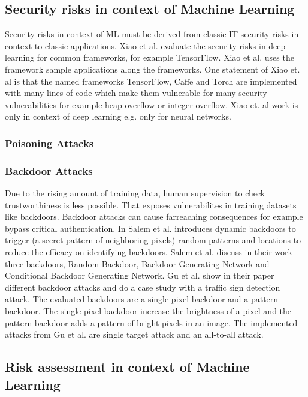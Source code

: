 \subsection{Security risks in context of Machine Learning}

Security risks in context of ML must be derived from classic IT security risks in context to classic applications. Xiao et al. \cite{DBLP:conf/sp/XiaoLZX18} evaluate the security risks in
deep learning for common frameworks, for example TensorFlow. Xiao et al. uses the framework sample applications along the frameworks. One statement of Xiao et. al is that the named
frameworks TensorFlow, Caffe and Torch are implemented with many lines of code which make them vulnerable for many security vulnerabilities for example heap overflow or integer overflow.
Xiao et. al work is only in context of deep learning e.g. only for neural networks.

\subsubsection*{Poisoning Attacks}


\subsubsection*{Backdoor Attacks}
\label{sec:backdoor}
Due to the rising amount of training data, human supervision to check trustworthiness is less possible. That exposes vulnerabilites in training datasets like backdoors. Backdoor attacks
can cause farreaching consequences for example bypass critical authentication. In \cite{DBLP:journals/corr/abs-2003-03675} Salem et al. introduces dynamic backdoors to trigger (a secret
pattern of neighboring pixels) random patterns and locations to reduce the efficacy on identifying backdoors. Salem et al. discuss in their work three backdoors, Random Backdoor, Backdoor
Generating Network and Conditional Backdoor Generating Network. Gu et al. show in their paper different backdoor attacks and do a case study with a traffic sign detection attack. The
evaluated backdoors are a single pixel backdoor and a pattern backdoor. The single pixel backdoor increase the brightness of a pixel and the pattern backdoor adds a pattern of bright
pixels in an image. The implemented attacks from Gu et al. are single target attack and an all-to-all attack.

\subsection{Risk assessment in context of Machine Learning}

